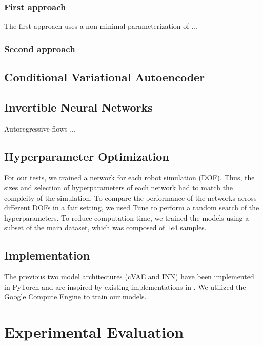 \documentclass[conference]{IEEEtran}
\begin{document}
\subsubsection*{First approach}
The first approach uses a  non-minimal parameterization of ...

\subsubsection*{Second approach}




\subsection*{Conditional Variational Autoencoder}

\subsection*{Invertible Neural Networks}

Autoregressive flows ...

\subsection*{Hyperparameter Optimization}

For our tests, we trained a network for each robot simulation (DOF). Thus, the sizes and selection of hyperparameters of each network had to match the compleity of the simulation. To compare the performance of the networks across different DOFs in a fair setting, we used Tune \cite{liaw2018tune} to perform a random search of the hyperparameters. To reduce computation time, we trained the models using a subset of the main dataset, which was composed of \( 1e4 \) samples.


\subsection*{Implementation}

The previous two model architectures (cVAE and INN) have been implemented in PyTorch and are inspired by existing implementations in  \cite{graviraja2019, freia2020}. We utilized the Google Compute Engine to train our models.

\section*{Experimental Evaluation}
\end{document}
